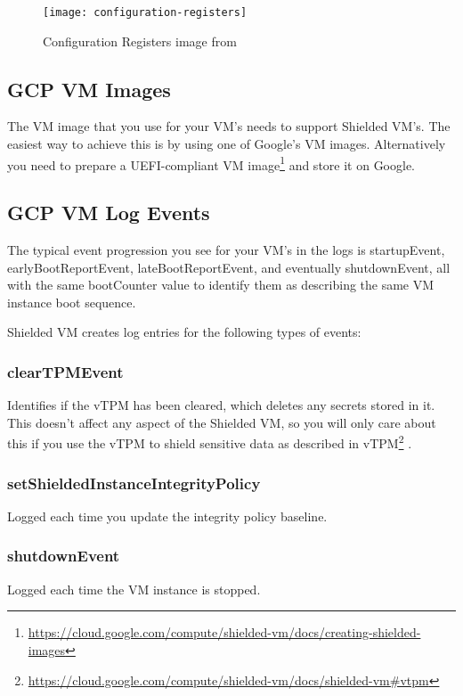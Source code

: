 \begin{figure}[!ht]
    \centering
    \texttt{[image: configuration-registers]}
    \caption{Configuration Registers image from \cite{arthur_platform_2015}}
    \label{fig:configuration-registers}
\end{figure}

\subsection*{GCP VM Images}
The VM image that you use for your VM’s needs to support Shielded VM’s. 
The easiest way to achieve this is by using one of Google’s VM images. 
Alternatively you need to prepare a 
UEFI-compliant VM image\footnote{\url{https://cloud.google.com/compute/shielded-vm/docs/creating-shielded-images}} 
and store it on Google.

\subsection*{GCP VM Log Events}
The typical event progression you see for your VM’s in the logs is startupEvent, 
earlyBootReportEvent, lateBootReportEvent, and eventually shutdownEvent, 
all with the same bootCounter value to identify them 
as describing the same VM instance boot sequence.

Shielded VM creates log entries for the following types of events:

\subsubsection*{clearTPMEvent}
Identifies if the vTPM has been cleared, which deletes any secrets stored in it. 
This doesn't affect any aspect of the Shielded VM, 
so you will only care about this if you use the vTPM 
to shield sensitive data as described in vTPM\footnote{\url{https://cloud.google.com/compute/shielded-vm/docs/shielded-vm#vtpm}} 
\citep{google_what_2022}.

\subsubsection*{setShieldedInstanceIntegrityPolicy}
Logged each time you update the integrity policy baseline.

\subsubsection*{shutdownEvent}
Logged each time the VM instance is stopped.

